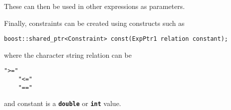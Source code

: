 These can then be used in other expressions as parameters.

Finally, constraints can be created using constructs such as

{
\color{red}
\begin{Verbatim}[fontseries=b]
boost::shared_ptr<Constraint> const(ExpPtr1 relation constant);
\end{Verbatim}
}

where the character string relation can be

{
\color{red}
\begin{Verbatim}[fontseries=b]
    ">="
    "<="
    "=="
\end{Verbatim}
}

and constant is a \texttt{\textbf{double}} or \texttt{\textbf{int}} value.

